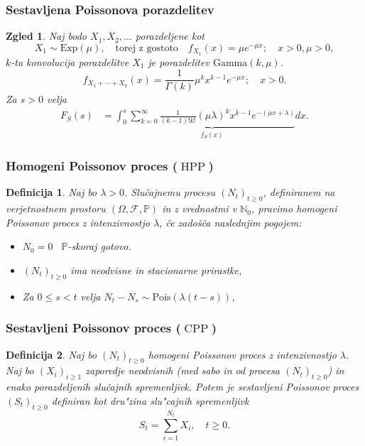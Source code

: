 \documentclass[]{beamer} %
\theoremstyle{plain}
\newtheorem{definicija}{Definicija}
\newtheorem{zgled}{Zgled}
\newcommand{\Prob}{\mathbb{P}}
\newcommand{\Pois}[1]{\text{Pois}(#1)}
\DeclareMathOperator{\HPP}{HPP}
\DeclareMathOperator{\CPP}{CPP}
\begin{document}
\begin{frame}
  \frametitle{Sestavljena Poissonova porazdelitev}
  \begin{zgled}
        Naj bodo $X_1, X_2, \dots$ porazdeljene kot
        \begin{equation*}
            X_1\sim\text{Exp}(\mu),\quad \text{torej z gostoto} \quad  f_{X_1}(x) = \mu e^{-\mu x}; \quad x>0, \mu > 0,
        \end{equation*}
        $k$-ta 
        konvolucija porazdelitve $X_1$ je porazdelitev $\text{Gamma}(k, \mu)$.
        \begin{equation*}
            f_{X_1 + \cdots + X_k}(x) = \frac{1}{\Gamma(k)}\mu^kx^{k-1}e^{-\mu x}; \quad x>0.
        \end{equation*}
        Za $s>0$ velja
        \begin{align*}
            F_{S}(s) 
            &= \int_0^s\underbrace{\sum_{k=0}^\infty \frac{1}{(k-1)!k!}(\mu\lambda)^kx^{k-1}e^{-(\mu x + \lambda)}}_{f_S(x)}dx.
        \end{align*}
  \end{zgled}
\end{frame}


\begin{frame}
  \frametitle{Homogeni Poissonov proces ($\HPP$)}
  \begin{definicija}
    Naj bo $\lambda > 0$. Slučajnemu procesu $(N_t)_{t\geq 0}$, definiranem na verjetnostnem 
    prostoru $(\Omega, \mathcal{F}, \mathbb{P})$ in z vrednostmi v $\mathbb{N}_0$, pravimo 
    \textit{homogeni Poissonov proces} z intenzivnostjo $\lambda$, če zadošča naslednjim pogojem:
    \begin{itemize}
        \item $N_0 = 0$ \ $\Prob$-skoraj gotovo.
        \item $(N_t)_{t\geq 0}$ ima neodvisne in stacionarne prirastke,
        \item Za $0 \leq s < t$ velja $ N_t - N_s \sim\Pois{\lambda(t - s)}$,
    \end{itemize}
  \end{definicija}
\end{frame}

\begin{frame}
  \frametitle{Sestavljeni Poissonov proces ($\CPP$)}
  \begin{definicija}
    Naj bo $(N_t)_{t\geq0}$ homogeni Poissonov proces z intenzivnostjo $\lambda$. 
    Naj bo $(X_i)_{i\geq1}$ zaporedje neodvisnih (med sabo in od procesa $(N_t)_{t\geq0}$) in enako 
    porazdeljenih slučajnih spremenljivk. Potem je 
    \textit{sestavljeni Poissonov proces} $(S_t)_{t\geq0}$ definiran kot dru"zina
    slu"cajnih spremenljivk
    $$
        S_t = \sum_{i=1}^{N_t} X_i, \quad t\geq0.
    $$
    \label{def:CPP}
  \end{definicija}
\end{frame}
\end{document}
